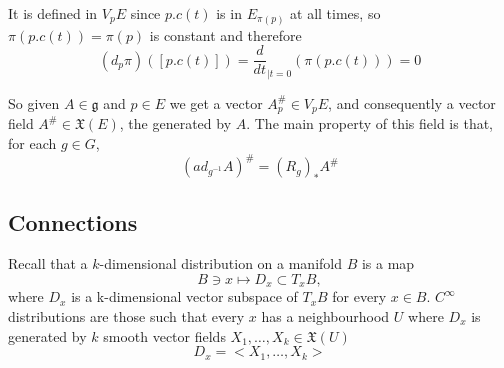 It is defined in $V_p E$ since $p.c(t)$ is in $E_{\pi(p)}$ at all times, so $\pi(p.c(t))=\pi(p)$ is constant and therefore
\[
 (d_p\pi)([p.c(t)])=\frac{d}{dt}_{|t=0}(\pi(p.c(t)))=0
\]

So given $A\in\mathfrak{g}$ and $p\in E$ we get a vector $A^{\#}_p\in V_p E$, and consequently a vector field $A^\#\in \mathfrak{X}(E)$, the  generated by $A$. The main property of this field is that, for each $g\in G$,\begin{equation}\label{mainproperty}
                    (ad_{g^{-1}}A)^\#   =(R_g)_*A^{\#}                                                                                                                                                                                                                                                                                                                                                                                                                                                                                                                            \end{equation}

\subsection{Connections} 

Recall that a $k$-dimensional distribution on a manifold $B$ is a map
\[
B\ni x \mapsto D_x \subset T_x B,
\]
where $D_x$ is a k-dimensional vector subspace of $T_x B$ for every $x\in B$. $C^\infty$ distributions are those such that every $x$ has a neighbourhood $U$ where $D_x$ is generated by $k$ smooth vector fields $X_1,\ldots,X_k\in \mathfrak{X}(U)$ \[
D_x=<X_1,\ldots,X_k>                                                                                                                                                   \]


